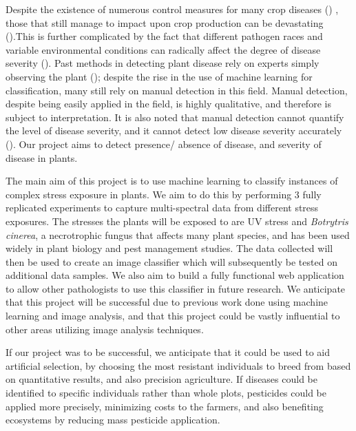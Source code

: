 \documentclass[a4paper]{article}
\begin{document}
    
    Despite the existence of numerous control measures for many crop diseases (\cite{wood_sustainable_1996})
    , those that still manage to impact upon crop production can be devastating 
    (\cite{mccook_global_2006,woodham-smith_great_1962}).This is further complicated by the fact that different pathogen races and variable environmental conditions can radically affect the degree of disease severity (\cite{dangl_plant_2006, suzuki_reactive_2006}).  Past methods in detecting plant disease
    rely on experts simply observing the plant (\cite{singh_detection_2017}); despite the rise in 
    the use of machine learning for classification, many still rely on manual detection in this field. 
    Manual detection, despite being easily applied in the field, is highly qualitative, and therefore
    is subject to interpretation. It is also noted that manual detection cannot quantify the level of disease 
    severity, and it cannot detect low disease severity accurately (\cite{lowe_hyperspectral_2017}). Our 
    project aims to detect presence/ absence of disease, and severity of disease in plants.
    
    The main aim of this project is to use machine learning to classify instances of complex stress 
    exposure in plants. We aim to do this by performing 3 fully replicated experiments to
    capture multi-spectral data from different stress exposures. The stresses the plants will be exposed to are UV stress and \textit{Botrytris cinerea}, a necrotrophic fungus that affects many plant species, and has been used widely in plant biology and pest management studies. The data collected will then be
    used to create an image classifier which will subsequently be tested on additional data samples.
    We also aim to build a fully functional web application to allow other pathologists to use this classifier in
    future research. We anticipate that this project will be successful due to previous work done 
    using machine learning and image analysis, and that this project could be vastly influential to other 
    areas utilizing image analysis techniques.
    
    If our project was to be successful, we anticipate that
    it could be used to aid artificial selection, by choosing the most resistant individuals to breed from
    based on quantitative results, and also precision agriculture. If diseases could be identified to 
    specific individuals rather than whole plots, pesticides could be applied more precisely, minimizing costs 
    to the farmers, and also benefiting ecosystems by reducing mass pesticide application.
\end{document}
